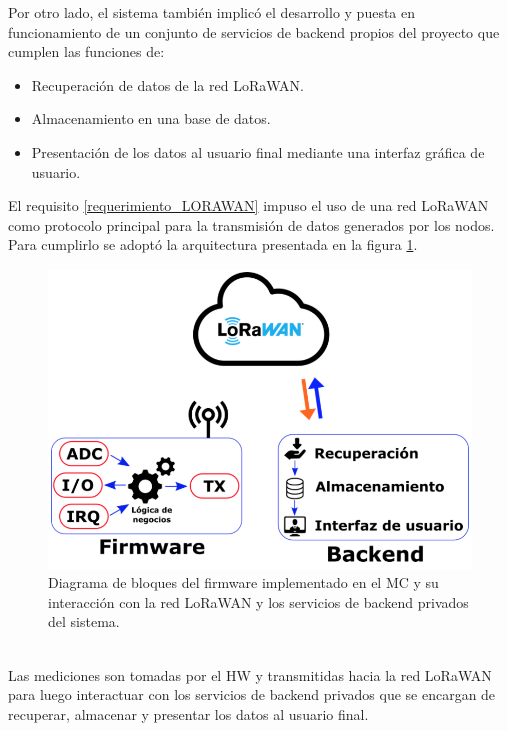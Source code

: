Por otro lado, el sistema también implicó el desarrollo y puesta en funcionamiento de un conjunto de servicios de backend propios del proyecto que cumplen las funciones de:
\begin{itemize}
	\item Recuperación de datos de la red LoRaWAN.
	\item Almacenamiento en una base de datos.
	\item Presentación de los datos al usuario final mediante una interfaz gráfica de usuario.
\end{itemize}

El requisito \ref{requerimiento_LORAWAN} impuso el uso de una red LoRaWAN como protocolo principal para la transmisión de datos generados por los nodos. Para cumplirlo se adoptó la arquitectura presentada en la figura \ref{fig:diagramadebloquesdebes}.\\
\begin{figure}[h!]
	\centering
	\includegraphics[width=0.8\linewidth]{Figures/diagrama_de_bloques_de_BES}
	\caption{Diagrama de bloques del firmware implementado en el MC y su interacción con la red LoRaWAN y los servicios de backend privados del sistema.}
	\label{fig:diagramadebloquesdebes}
\end{figure}\\
Las mediciones son tomadas por el HW y transmitidas hacia la red LoRaWAN para luego interactuar con los servicios de backend privados que se encargan de recuperar, almacenar y presentar los datos al usuario final.\\

